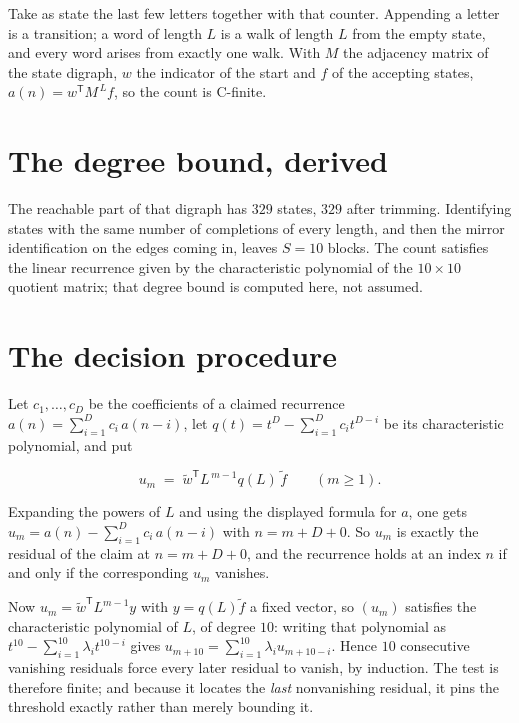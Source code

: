 \documentclass[11pt]{article}
\theoremstyle{definition}
\begin{document}
Take as state the last few letters together with that counter. Appending a letter is a transition; a word of length $L$ is a walk of length $L$ from the empty state, and every word arises from exactly one walk. With $M$ the adjacency matrix of the state digraph, $w$ the indicator of the start and $f$ of the accepting states, $a(n) = w^{\mathsf T}M^{\,L}f$, so the count is C-finite.

\section{The degree bound, derived}

The reachable part of that digraph has $329$ states, $329$ after trimming. Identifying states with the same number of completions of every length, and then the mirror identification on the edges coming in, leaves $S = 10$ blocks. The count satisfies the linear recurrence given by the characteristic polynomial of the $10\times10$ quotient matrix; that degree bound is computed here, not assumed.

\section{The decision procedure}

Let $c_1,\dots,c_D$ be the coefficients of a claimed recurrence $a(n) = \sum_{i=1}^{D} c_i\,a(n-i)$, let $q(t) = t^{D} - \sum_{i=1}^{D} c_i t^{D-i}$ be its characteristic polynomial, and put

\[u_m \;=\; \tilde w^{\mathsf T} L^{\,m-1} q(L)\,\tilde f \qquad (m \ge 1).\]

Expanding the powers of $L$ and using the displayed formula for $a$, one gets $u_m = a(n) - \sum_{i=1}^{D} c_i\,a(n-i)$ with $n = m + D + 0$. So $u_m$ is exactly the residual of the claim at $n = m + D + 0$, and the recurrence holds at an index $n$ if and only if the corresponding $u_m$ vanishes.

Now $u_m = \tilde w^{\mathsf T} L^{m-1} y$ with $y = q(L)\tilde f$ a fixed vector, so $(u_m)$ satisfies the characteristic polynomial of $L$, of degree $10$: writing that polynomial as $t^{10} - \sum_{i=1}^{10} \lambda_i t^{10-i}$ gives $u_{m+10} = \sum_{i=1}^{10} \lambda_i u_{m+10-i}$. Hence $10$ consecutive vanishing residuals force every later residual to vanish, by induction. The test is therefore finite; and because it locates the {\itshape last} nonvanishing residual, it pins the threshold exactly rather than merely bounding it.
\end{document}
